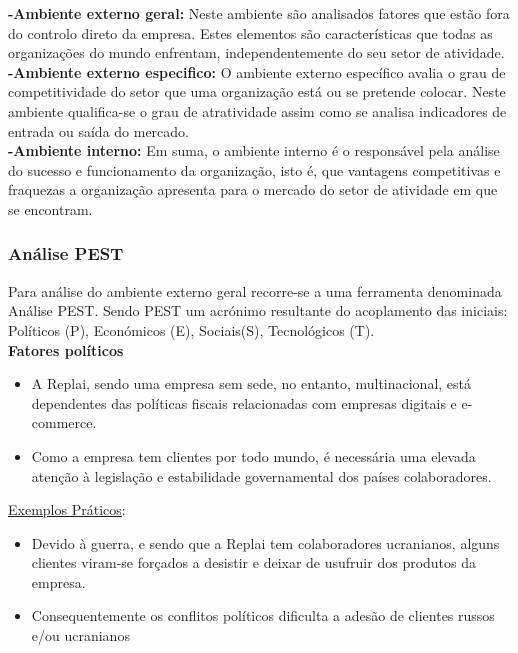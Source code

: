 	\textbf{-Ambiente externo geral:} Neste ambiente são analisados fatores que estão fora do controlo direto da empresa. Estes elementos são características que todas as organizações do mundo enfrentam, independentemente do seu setor de atividade. \\
	

	\textbf{-Ambiente externo especifico:} O ambiente externo específico avalia o grau de competitividade do setor que uma organização está ou se pretende colocar.  Neste ambiente qualifica-se o grau de atratividade assim como se analisa indicadores de entrada ou saída do mercado.\\

	\textbf{-Ambiente interno:} Em suma, o ambiente interno é o responsável pela análise do sucesso e funcionamento da organização, isto é, que vantagens competitivas e fraquezas a organização apresenta para o mercado do setor de atividade em que se encontram. \\
	
	
\newpage
\subsubsection{Análise PEST}
Para análise do ambiente externo geral recorre-se a uma ferramenta denominada Análise PEST. Sendo PEST um acrónimo resultante do acoplamento das iniciais: Políticos (P), Económicos (E), Sociais(S), Tecnológicos (T). \\



\noindent \textbf{Fatores políticos} %
\begin{itemize}
    \item A Replai, sendo uma empresa sem sede, no entanto, multinacional, está dependentes das políticas fiscais relacionadas com empresas digitais e e-commerce.
    \item Como a empresa tem clientes por todo mundo, é necessária uma elevada atenção à legislação e estabilidade governamental dos países colaboradores.
\end{itemize}

\underline{Exemplos Práticos}:
\begin{itemize}
    \item Devido à guerra, e sendo que a Replai tem colaboradores ucranianos, alguns clientes viram-se forçados a desistir e deixar de usufruir dos produtos da empresa.
    \item Consequentemente os conflitos políticos dificulta a adesão de clientes russos e/ou ucranianos \\
\end{itemize}


